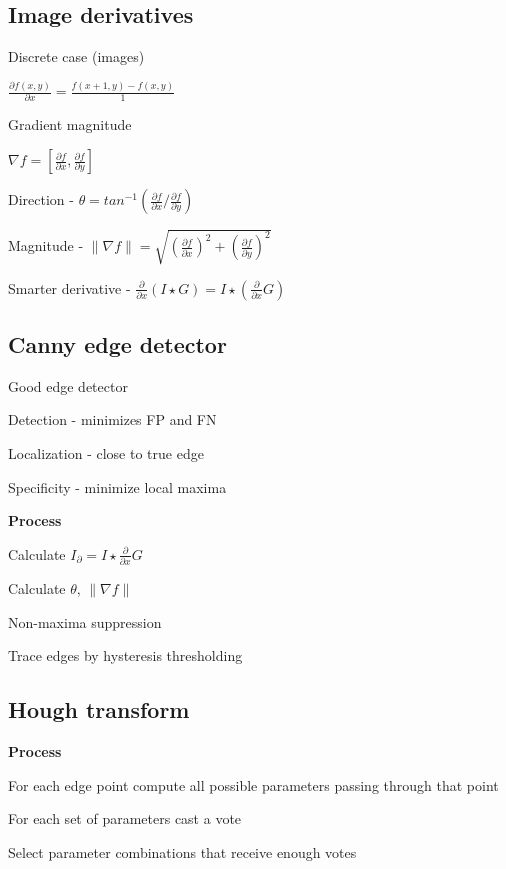 \documentclass{article}
\begin{document}
\begin{multicols*}{2}
{	\subsection{Image derivatives}

	Discrete case (images)

	$\frac{\partial f(x,y)}{\partial x} = \frac{f(x+1, y)-f(x,y)}{1}$

	Gradient magnitude

	$\nabla f = [\frac{\partial f}{\partial x}, \frac{\partial f}{\partial y}]$

	Direction - $\theta = tan^{-1}(\frac{\partial f}{\partial x} / \frac{\partial f}{\partial y})$

	Magnitude - $\| \nabla f \| = \sqrt{(\frac{\partial f}{\partial x})^2 + (\frac{\partial f}{\partial y})^2}$

	Smarter derivative - $\frac{\partial}{\partial x}(I \star G) = I \star (\frac{\partial}{\partial x} G)$

	\subsection{Canny edge detector}

	Good edge detector

	\begin{compactitem}
		\item Detection - minimizes FP and FN
		\item Localization - close to true edge
		\item Specificity - minimize local maxima
	\end{compactitem}

	\textbf{Process}
	\begin{compactenum}
		\item Calculate $I_\partial = I \star \frac{\partial}{\partial x} G$
		\item Calculate $\theta$, $\| \nabla f \|$
		\item Non-maxima suppression
		\item Trace edges by hysteresis thresholding
	\end{compactenum}

	\subsection{Hough transform}

	\textbf{Process}
	\begin{compactenum}
		\item For each edge point compute all possible parameters passing through that point
		\item For each set of parameters cast a vote
		\item Select parameter combinations that receive enough votes
	\end{compactenum}

}
\end{multicols*}
\end{document}

